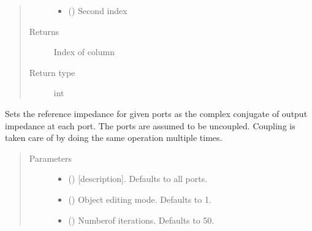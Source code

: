 \documentclass[letterpaper,10pt,english]{sphinxmanual}
\begin{document}
\begin{fulllineitems}
\begin{fulllineitems}
\begin{quote}
\begin{description}
\begin{itemize}
\item {} 
 () \textendash{} Second index

\end{itemize}

\item[{Returns}] \leavevmode
Index of column

\item[{Return type}] \leavevmode
int

\end{description}\end{quote}

\end{fulllineitems}


\begin{fulllineitems}
\label{\detokenize{touchstone:touchstone.spfile.conj_match_uncoupled}}
Sets the reference impedance for given ports as the complex conjugate of output impedance at each port.
The ports are assumed to be uncoupled. Coupling is taken care of by doing the same operation multiple times.
\begin{quote}\begin{description}
\item[{Parameters}] \leavevmode\begin{itemize}
\item {} 
 (\sphinxstyleliteralemphasis{\sphinxupquote{,}}) \textendash{} {[}description{]}. Defaults to all ports.

\item {} 
 (\sphinxstyleliteralemphasis{\sphinxupquote{, }}) \textendash{} Object editing mode. Defaults to \sphinxhyphen{}1.

\item {} 
 (\sphinxstyleliteralemphasis{\sphinxupquote{, }}) \textendash{} Numberof iterations. Defaults to 50.


\end{itemize}
\end{description}
\end{quote}
\end{fulllineitems}
\end{fulllineitems}
\end{document}
